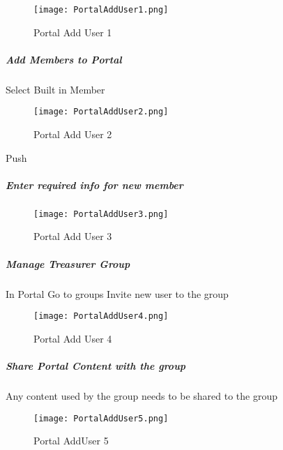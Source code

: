   \begin{figure}[h!]
  \centering
      \texttt{[image: PortalAddUser1.png]}
  \caption{Portal Add User 1}
  \end{figure}
  \clearpage

  \subparagraph{Add Members to Portal}

  \vspace{.4in}

  {\Large Select Built in Member {\rtArrow}}
  \vspace{.4in}

  \begin{figure}[h!]
  \centering
      \texttt{[image: PortalAddUser2.png]}
  \caption{Portal Add User 2}
  \end{figure}

 {\bigbtn Push }

  \clearpage
  \subparagraph{Enter required info for new member}
  \vspace{.5in}

  \begin{figure}[h!]
  \centering
      \texttt{[image: PortalAddUser3.png]}
  \caption{Portal Add User 3}
  \end{figure}
  \clearpage
  \subparagraph{Manage Treasurer Group}
  \vspace{.5in}

  In Portal {\rtArrow} Go to groups {\rtArrow} Invite new user to the group
  \vspace{.5in}

  \begin{figure}[h!]
  \centering
      \texttt{[image: PortalAddUser4.png]}
  \caption{Portal Add User 4}
  \end{figure}
  \clearpage
  \subparagraph{Share Portal Content with the group}
  \vspace{.5in}

  \noindent Any content used by the group needs to be shared to the group
  \vspace{.5in}

  \begin{figure}[h!]
  \centering
      \texttt{[image: PortalAddUser5.png]}
  \caption{Portal AddUser 5}
  \end{figure}
  \clearpage


